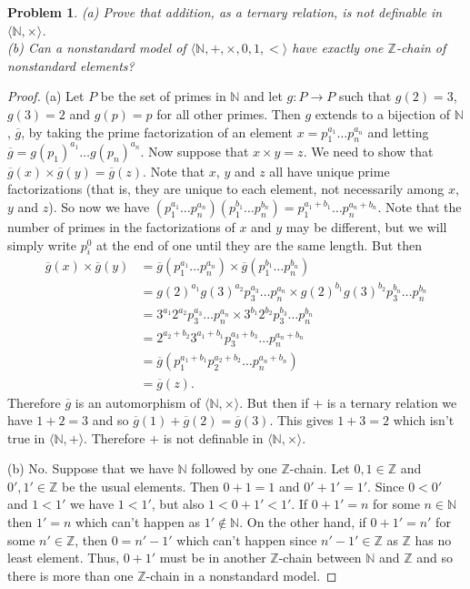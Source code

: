 \documentclass{article}
\newtheorem{problem}{Problem}
\begin{document}
\begin{problem}
(a) Prove that addition, as a ternary relation, is not definable in $\langle \mathbb{N}, \times \rangle$.\\
(b) Can a nonstandard model of $\langle \mathbb{N}, +, \times, 0, 1, < \rangle$ have exactly one $\mathbb{Z}$-chain of nonstandard elements?
\end{problem}
\begin{proof}
(a) Let $P$ be the set of primes in $\mathbb{N}$ and let $g : P \to P$ such that $g(2) = 3$, $g(3) = 2$ and $g(p) = p$ for all other primes. Then $g$ extends to a bijection of $\mathbb{N}$, $\overline{g}$, by taking the prime factorization of an element $x = p_1^{a_1} \dots p_n^{a_n}$ and letting $\overline{g} = g(p_1)^{a_1} \dots g(p_n)^{a_n}$. Now suppose that $x \times y = z$. We need to show that $\overline{g}(x) \times \overline{g}(y) = \overline{g}(z)$. Note that $x$, $y$ and $z$ all have unique prime factorizations (that is, they are unique to each element, not necessarily among $x$, $y$ and $z$). So now we have $(p_1^{a_1} \dots p_n^{a_n})(p_1^{b_1} \dots p_n^{b_n}) = p_1^{a_1 + b_1} \dots p_n^{a_n+b_n}$. Note that the number of primes in the factorizations of $x$ and $y$ may be different, but we will simply write $p_i^0$ at the end of one until they are the same length. But then
\begin{align*}
\overline{g}(x) \times \overline{g}(y)
&= \overline{g}(p_1^{a_1} \dots p_n^{a_n}) \times \overline{g}(p_1^{b_1} \dots p_n^{b_n})\\
&= g(2)^{a_1}g(3)^{a_2}p_3^{a_3} \dots p_n^{a_n} \times g(2)^{b_1}g(3)^{b_2}p_3^{b_n} \dots p_n^{b_n}\\
&= 3^{a_1}2^{a_2}p_3^{a_3} \dots p_n^{a_n} \times 3^{b_1}2^{b_2}p_3^{b_3} \dots p_n^{b_n}\\
&= 2^{a_2+b_2}3^{a_1+b_1}p_3^{a_3 + b_3} \dots p_n^{a_n + b_n}\\
&= \overline{g}(p_1^{a_1+b_1}p_2^{a_2 + b_2} \dots p_n^{a_n+b_n})\\
&= \overline{g}(z).
\end{align*}
Therefore $\overline{g}$ is an automorphism of $\langle \mathbb{N}, \times \rangle$. But then if $+$ is a ternary relation we have $1 + 2 = 3$ and so $\overline{g}(1) + \overline{g}(2) = \overline{g}(3)$. This gives $1 + 3 = 2$ which isn't true in $\langle \mathbb{N}, + \rangle$. Therefore $+$ is not definable in $\langle \mathbb{N}, \times \rangle$.

(b) No. Suppose that we have $\mathbb{N}$ followed by one $\mathbb{Z}$-chain. Let $0, 1 \in \mathbb{Z}$ and $0', 1' \in \mathbb{Z}$ be the usual elements. Then $0 + 1 = 1$ and $0' + 1' = 1'$. Since $0 < 0'$ and $1 < 1'$ we have $1 < 1'$, but also $1 < 0 + 1' < 1'$. If $0 + 1' = n$ for some $n \in \mathbb{N}$ then $1' = n$ which can't happen as $1' \notin \mathbb{N}$. On the other hand, if $0 + 1' = n'$ for some $n' \in \mathbb{Z}$, then $0 = n'-1'$ which can't happen since $n'-1' \in \mathbb{Z}$ as $\mathbb{Z}$ has no least element. Thus, $0 + 1'$ must be in another $\mathbb{Z}$-chain between $\mathbb{N}$ and $\mathbb{Z}$ and so there is more than one $\mathbb{Z}$-chain in a nonstandard model.
\end{proof}
\end{document}
